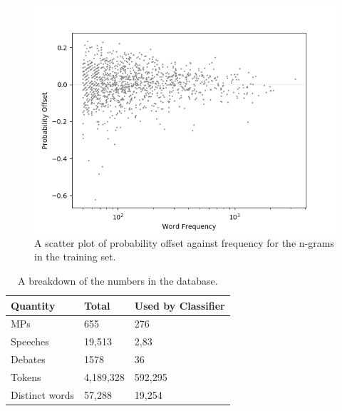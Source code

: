 \documentclass[12pt,a4paper,twoside,openright]{report}
\begin{document}
\\\\
\begin{figure}
	\begin{center}
		\includegraphics[scale=0.8]{figs/ngramoffset.png}
	\end{center}
	\caption{A scatter plot of probability offset against frequency for the n-grams in the training set.}
	\label{fig:ngramoffset}
\end{figure} 
\begin{table}[]
	\centering
	\begin{tabular}{lll}
		\hline
		\textbf{Quantity} & \textbf{Total} & \textbf{Used by Classifier} \\ \hline
		MPs               & 655            & 276                         \\
		Speeches          & 19,513         & 2,83                        \\
		Debates           & 1578           & 36                          \\ 
		Tokens            & 4,189,328      & 592,295                     \\
		Distinct words    & 57,288         & 19,254                      \\ \hline
	\end{tabular}
	\caption{A breakdown of the numbers in the database.}
	\label{table:databasestats}	
\end{table}
\end{document}
